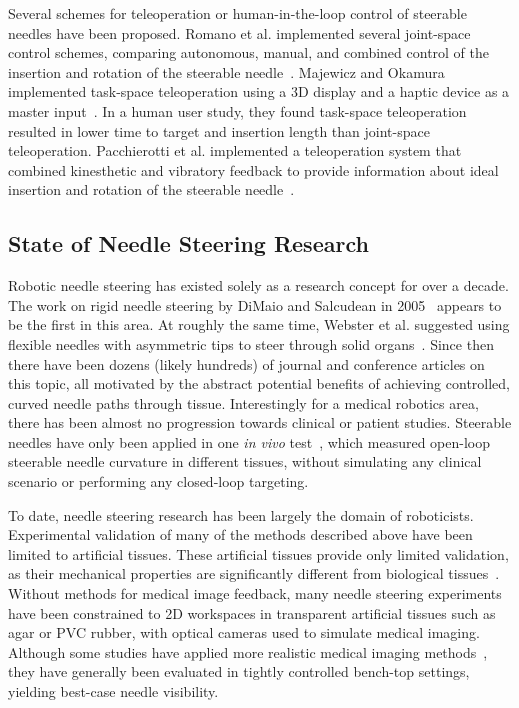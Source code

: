 Several schemes for teleoperation or human-in-the-loop control of steerable needles have been proposed. Romano et al. implemented several joint-space control schemes, comparing autonomous, manual, and combined control of the insertion and rotation of the steerable needle~\cite{Romano2007}. Majewicz and Okamura implemented task-space teleoperation using a 3D display and a haptic device as a master input~\cite{Majewicz2013}. In a human user study, they found task-space teleoperation resulted in lower time to target and insertion length than joint-space teleoperation. Pacchierotti et al. implemented a teleoperation system that combined kinesthetic and
vibratory feedback to provide information about ideal insertion and rotation of the steerable needle~\cite{Pacchierotti2014}.

\subsection{State of Needle Steering Research}
Robotic needle steering has existed solely as a research concept for over a decade. The work on rigid needle steering by DiMaio and Salcudean in 2005~\cite{DiMaio2005} appears to be the first in this area. At roughly the same time, Webster et al. suggested using flexible needles with asymmetric tips to steer through solid organs~\cite{Webster2005}. Since then there have been dozens (likely hundreds) of journal and conference articles on this topic, all motivated by the abstract potential benefits of achieving controlled, curved needle paths through tissue. Interestingly for a medical robotics area, there has been almost no progression towards clinical or patient studies. Steerable needles have only been applied in one \textit{in vivo} test~\cite{Majewicz2012}, which measured open-loop steerable needle curvature in different tissues, without simulating any clinical scenario or performing any closed-loop targeting.

To date, needle steering research has been largely the domain of roboticists. Experimental validation of many of the methods described above have been limited to artificial tissues. These artificial tissues provide only limited validation, as their mechanical properties are significantly different from biological tissues~\cite{Wedlick2012}. Without methods for medical image feedback, many needle steering experiments have been constrained to 2D workspaces in transparent artificial tissues such as agar or PVC rubber, with optical cameras used to simulate medical imaging. Although some studies have applied more realistic medical imaging methods~\cite{Glozman2007,Neubach2010,Abayazid2014}, they have generally been evaluated in tightly controlled bench-top settings, yielding best-case needle visibility.

